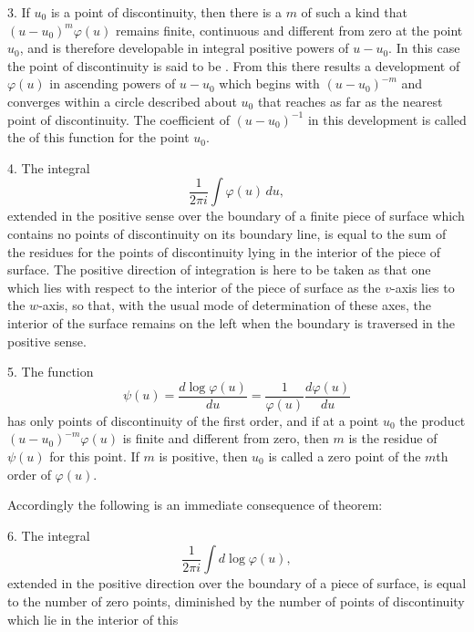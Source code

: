
3. If $u_0$ is a point of discontinuity, then there is a  $m$ of such a kind that $(u-u_0)^m\varphi(u)$ remains finite, continuous and different from zero at the point $u_0$, and is therefore developable in integral positive powers of $u - u_0$. In this case the point of discontinuity is said to be . From this there results a development of $\varphi(u)$ in ascending powers of $u - u_0$ which begins with $(u-u_0)^{-m}$ and converges within a circle described about $u_0$ that reaches as far as the nearest point of discontinuity. The coefficient of $(u-u_0)^{-1}$ in this development is called the  of this function for the point $u_0$.

4.  The integral
\[
\frac{1}{2\pi i}\int \varphi(u)\,du,
\]
extended in the positive sense over the boundary of a finite piece of surface which contains no points of discontinuity on its boundary line, is equal to the sum of the residues for the points of discontinuity lying in the interior of the piece of surface. The positive direction of integration is here to be taken as that one which lies with respect to the interior of the piece of surface as the $v$-axis lies to the $w$-axis, so that, with the usual mode of determination of these axes, the interior of the surface remains on the left when the boundary is traversed in the positive sense.

5. The function
\[
\psi(u) = \frac{d\log\varphi(u)}{du} = \frac{1}{\varphi(u)}\frac{d\varphi(u)}{du}
\]
has only points of discontinuity of the first order, and if at a point $u_0$ the product $(u-u_0)^{-m}\varphi(u)$ is finite and different from zero, then $m$ is the residue of $\psi(u)$ for this point. If $m$ is positive, then $u_0$ is called a zero point of the $m$th order of $\varphi(u)$.

Accordingly the following is an immediate consequence of  theorem:

6. The integral
\[
\frac{1}{2\pi i}\int d\log\varphi(u),
\]
extended in the positive direction over the boundary of a piece of surface, is equal to the number of zero points, diminished by the number of points of discontinuity which lie in the interior of this
